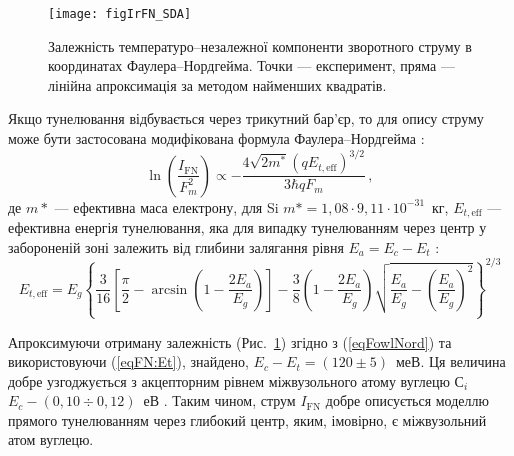 \begin{figure}
\center
\texttt{[image: figIrFN\_SDA]}
\caption{\label{figIrFN_SDA}
Залежність температуро--незалежної компоненти зворотного струму
в координатах Фаулера--Нордгейма.
Точки --- експеримент, пряма --- лінійна апроксимація за методом найменших квадратів.
}%
\end{figure}

Якщо тунелювання відбувається через трикутний бар'єр, то для опису струму може бути застосована
модифікована формула Фаулера--Нордгейма  \cite{Rhoderick1988,Novikov,Kurnosova}:
\begin{equation}\label{eqFowlNord}
    \ln\left(\frac{I_\mathrm{FN}}{F_m^2}\right)\propto -\frac{4 \sqrt{2m^*}(qE_{t,\mathrm{eff}})^{3/2}}{3\hbar q F_m}\,,
\end{equation}
де
$m*$ ---  ефективна маса електрону,
для Si $m* = 1,08\cdot9,11\cdot10^{-31}$~кг,
$E_{t,\mathrm{eff}}$ --– ефективна енергія тунелювання,
яка для випадку тунелюванням через центр у забороненій зоні залежить від глибини залягання рівня $E_a=E_c-E_t$ \cite{Kurnosova,Bulyarskii2001r}:
\begin{equation}\label{eqFN:Et}
    E_{t,\mathrm{eff}}=E_g\left\{\frac{3}{16}\left[\frac{\pi}{2}-
     \arcsin\left(1-\frac{2E_a}{E_g}\right)\right]-\frac{3}{8}\left(1-\frac{2E_a}{E_g}\right)
     \sqrt{\frac{E_a}{E_g}-\left(\frac{E_a}{E_g}\right)^2}\right\}^{2/3}
\end{equation}


Апроксимуючи отриману залежність (Рис.~\ref{figIrFN_SDA}) згідно з (\ref{eqFowlNord}) та використовуючи (\ref{eqFN:Et}),
знайдено, $E_c-E_t=(120\pm5)$~меВ.
Ця величина добре узгоджується з акцепторним рівнем міжвузольного атому вуглецю С$_i$ $E_c-(0,10\div0,12)$~еВ \cite{Vavilov1990r,Song1987}.
Таким чином, струм $I_\mathrm{FN}$ добре описується моделлю прямого тунелюванням через глибокий центр, яким, імовірно, є міжвузольний атом вуглецю.
